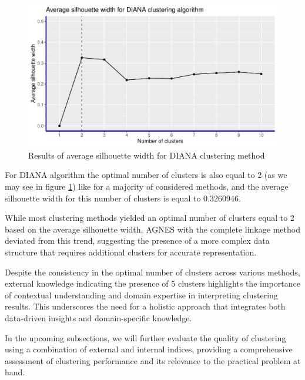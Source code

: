 \documentclass[11pt,a4paper]{article}\usepackage[]{graphicx}\usepackage[]{xcolor}
\makeatletter
\def\maxwidth{ %
  \ifdim\Gin@nat@width>\linewidth
    \linewidth
  \else
    \Gin@nat@width
  \fi
}
\newenvironment{knitrout}{}{} %
\makeatother
\begin{document}
	
\begin{knitrout}
\color{fgcolor}\begin{figure}
\includegraphics[width=\maxwidth]{figure/diana_silhouette-1} \caption[Results of average silhouette width for DIANA clustering method]{Results of average silhouette width for DIANA clustering method}\label{fig:diana_silhouette}
\end{figure}

\end{knitrout}
	
	For DIANA algorithm the optimal number of clusters is also equal to 2 (as we may see in figure \ref{fig:diana_silhouette}) like for a majority of considered methods, and the average silhouette width for this number of clusters is equal to 0.3260946.
	
	While most clustering methods yielded an optimal number of clusters equal to 2 based on the average silhouette width, AGNES with the complete linkage method deviated from this trend, suggesting the presence of a more complex data structure that requires additional clusters for accurate representation.
	
	Despite the consistency in the optimal number of clusters across various methods, external knowledge indicating the presence of 5 clusters highlights the importance of contextual understanding and domain expertise in interpreting clustering results. This underscores the need for a holistic approach that integrates both data-driven insights and domain-specific knowledge.
	
	In the upcoming subsections, we will further evaluate the quality of clustering using a combination of external and internal indices, providing a comprehensive assessment of clustering performance and its relevance to the practical problem at hand.
	
\end{document}
